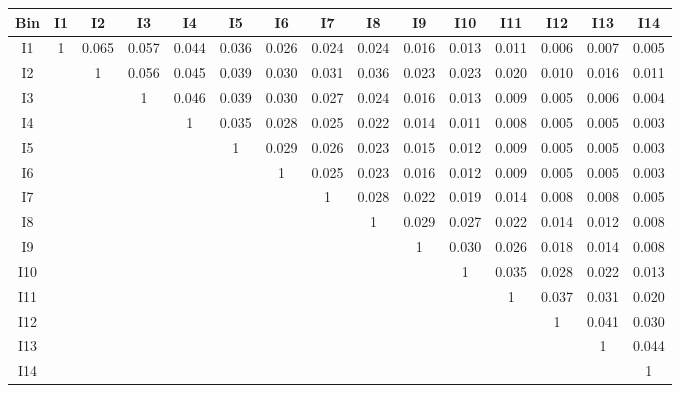 \begin{tabular}{c@{~~~}c@{~~}c@{~~}c@{~~}c@{~~}c@{~~}c@{~~}c@{~~}c@{~~}c@{~~}c@{~~}c@{~~}c@{~~}c@{~~}c}
\hline 
 \hline 
Bin	& I1 & I2 & I3 & I4 & I5 & I6 & I7 & I8 & I9 & I10 & I11 & I12 & I13 & I14 \\ 
\hline 
I1	&  1 &  0.065 &  0.057 &  0.044 &  0.036 &  0.026 &  0.024 &  0.024 &  0.016 &  0.013 &  0.011 &  0.006 &  0.007 &  0.005 \\  
I2	&   &  1 &  0.056 &  0.045 &  0.039 &  0.030 &  0.031 &  0.036 &  0.023 &  0.023 &  0.020 &  0.010 &  0.016 &  0.011 \\  
I3	&   &   &  1 &  0.046 &  0.039 &  0.030 &  0.027 &  0.024 &  0.016 &  0.013 &  0.009 &  0.005 &  0.006 &  0.004 \\  
I4	&   &   &   &  1 &  0.035 &  0.028 &  0.025 &  0.022 &  0.014 &  0.011 &  0.008 &  0.005 &  0.005 &  0.003 \\  
I5	&   &   &   &   &  1 &  0.029 &  0.026 &  0.023 &  0.015 &  0.012 &  0.009 &  0.005 &  0.005 &  0.003 \\  
I6	&   &   &   &   &   &  1 &  0.025 &  0.023 &  0.016 &  0.012 &  0.009 &  0.005 &  0.005 &  0.003 \\  
I7	&   &   &   &  &   &   &  1 &  0.028 &  0.022 &  0.019 &  0.014 &  0.008 &  0.008 &  0.005 \\  
I8	&   &   &   &   &   &  &   &  1 &  0.029 &  0.027 &  0.022 &  0.014 &  0.012 &  0.008 \\  
I9	&   &   &   &   &   &   &   &   &  1 &  0.030 &  0.026 &  0.018 &  0.014 &  0.008 \\  
I10	&  &   &   &  &   &   &   &   &   &  1 &  0.035 &  0.028 &  0.022 &  0.013 \\  
I11	&   &  &   &   &  &   &   &   &  &   &  1 &  0.037 &  0.031 &  0.020 \\  
I12	&   &   &   &   &   &   &   &   &   &   &   &  1 &  0.041 &  0.030 \\  
I13	&   &   &   &   &   &   &  &   &   &   &   &   &  1 &  0.044 \\  
I14	&   &   &   &   &   &   &   &   &   &   &   &   &   &  1 \\  
\hline 
 \hline 
\end{tabular}